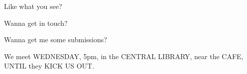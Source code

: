Like what you see?

Wanna get in touch?

Wanna get me some submissions?

We meet WEDNESDAY, 5pm, in the CENTRAL LIBRARY, near the CAFE, UNTIL they KICK US OUT.
